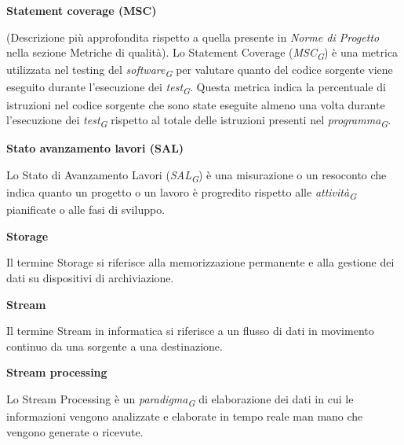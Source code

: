 \documentclass{article}
\begin{document}
\textbf{Statement coverage (MSC)}

\vspace{0.1cm}

(Descrizione più approfondita rispetto a quella presente in \textit{Norme di Progetto} nella sezione Metriche di qualità). Lo Statement Coverage (\textit{MSC}\textsubscript{\textit{G}}) è una metrica utilizzata nel testing del \textit{software}\textsubscript{\textit{G}} per valutare quanto del codice sorgente viene eseguito durante l'esecuzione dei \textit{test}\textsubscript{\textit{G}}.
Questa metrica indica la percentuale di istruzioni nel codice sorgente che sono state eseguite almeno una volta durante l'esecuzione dei \textit{test}\textsubscript{\textit{G}} rispetto al totale delle istruzioni presenti nel \textit{programma}\textsubscript{\textit{G}}. 

\vspace{0.4cm}

\textbf{Stato avanzamento lavori (SAL)}

\vspace{0.1cm}

Lo Stato di Avanzamento Lavori (\textit{SAL}\textsubscript{\textit{G}}) è una misurazione o un resoconto che indica quanto un progetto o un lavoro è progredito rispetto alle \textit{attività}\textsubscript{\textit{G}} pianificate o alle fasi di sviluppo.

\vspace{0.4cm}

\textbf{Storage}

\vspace{0.1cm}

Il termine Storage si riferisce alla memorizzazione permanente e alla gestione dei dati su dispositivi di archiviazione.

\vspace{0.4cm}

\textbf{Stream}

\vspace{0.1cm}

Il termine Stream in informatica si riferisce a un flusso di dati in movimento continuo da una sorgente a una destinazione.

\vspace{0.4cm}

\textbf{Stream processing}

\vspace{0.1cm}

Lo Stream Processing è un \textit{paradigma}\textsubscript{\textit{G}} di elaborazione dei dati in cui le informazioni vengono analizzate e elaborate in tempo reale man mano che vengono generate o ricevute.
\end{document}
